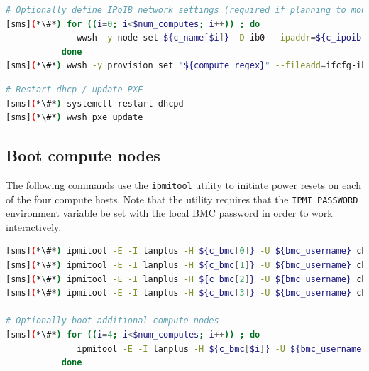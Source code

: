\documentclass[letterpaper]{article}
\begin{document}
\begin{lstlisting}[language=bash,keywords={},upquote=true,basicstyle=\footnotesize\ttfamily]
# Optionally define IPoIB network settings (required if planning to mount Lustre over IB)
[sms](*\#*) for ((i=0; i<$num_computes; i++)) ; do
              wwsh -y node set ${c_name[$i]} -D ib0 --ipaddr=${c_ipoib[$i]} --netmask=${ipoib_netmask}
           done
[sms](*\#*) wwsh -y provision set "${compute_regex}" --fileadd=ifcfg-ib0.ww
\end{lstlisting}



\clearpage
\begin{lstlisting}[language=bash,keywords={},upquote=true,basicstyle=\footnotesize\ttfamily]
# Restart dhcp / update PXE
[sms](*\#*) systemctl restart dhcpd
[sms](*\#*) wwsh pxe update
\end{lstlisting}





\subsection{Boot compute nodes} \label{sec:boot_computes}

 
The following commands use the \texttt{ipmitool} utility to initiate power
resets on each of the four compute hosts. Note that the utility requires that
the \texttt{IPMI\_PASSWORD} environment variable be set with the local BMC password in
order to work interactively.

\begin{lstlisting}[language=bash,keywords={},upquote=true]
[sms](*\#*) ipmitool -E -I lanplus -H ${c_bmc[0]} -U ${bmc_username} chassis power reset   # power cycle c1
[sms](*\#*) ipmitool -E -I lanplus -H ${c_bmc[1]} -U ${bmc_username} chassis power reset   # power cycle c2
[sms](*\#*) ipmitool -E -I lanplus -H ${c_bmc[2]} -U ${bmc_username} chassis power reset   # power cycle c3
[sms](*\#*) ipmitool -E -I lanplus -H ${c_bmc[3]} -U ${bmc_username} chassis power reset   # power cycle c4

# Optionally boot additional compute nodes
[sms](*\#*) for ((i=4; i<$num_computes; i++)) ; do
              ipmitool -E -I lanplus -H ${c_bmc[$i]} -U ${bmc_username} chassis power reset
           done
\end{lstlisting} 
\end{document}
